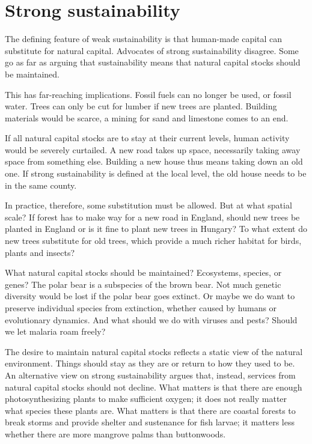 \section{Strong sustainability}
The defining feature of weak sustainability is that human-made capital can substitute for natural capital. Advocates of strong sustainability disagree. Some go as far as arguing that sustainability means that natural capital stocks should be maintained.

This has far-reaching implications. Fossil fuels can no longer be used, or fossil water. Trees can only be cut for lumber if new trees are planted. Building materials would be scarce, a mining for sand and limestone comes to an end.

If all natural capital stocks are to stay at their current levels, human activity would be severely curtailed. A new road takes up space, necessarily taking away space from something else. Building a new house thus means taking down an old one. If strong sustainability is defined at the local level, the old house needs to be in the same county.

In practice, therefore, some substitution must be allowed. But at what spatial scale? If forest has to make way for a new road in England, should new trees be planted in England or is it fine to plant new trees in Hungary? To what extent do new trees substitute for old trees, which provide a much richer habitat for birds, plants and insects?

What natural capital stocks should be maintained? Ecosystems, species, or genes? The polar bear is a subspecies of the brown bear. Not much genetic diversity would be lost if the polar bear goes extinct. Or maybe we do want to preserve individual species from extinction, whether caused by humans or evolutionary dynamics. And what should we do with viruses and pests? Should we let malaria roam freely?

The desire to maintain natural capital stocks reflects a static view of the natural environment. Things should stay as they are or return to how they used to be. An alternative view on strong sustainability argues that, instead, services from natural capital stocks should not decline. What matters is that there are enough photosynthesizing plants to make sufficient oxygen; it does not really matter what species these plants are. What matters is that there are coastal forests to break storms and provide shelter and sustenance for fish larvae; it matters less whether there are more mangrove palms than buttonwoods.

